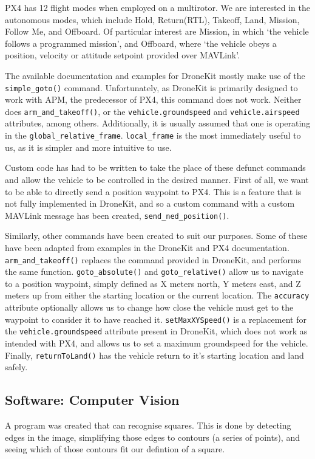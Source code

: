 \documentclass[11pt]{article}
\begin{document}
PX4 has 12 flight modes when employed on a multirotor. We are interested in the autonomous modes, which include Hold, Return(RTL), Takeoff, Land, Mission, Follow Me, and Offboard. Of particular interest are Mission, in which `the vehicle follows a programmed mission', and Offboard, where `the vehicle obeys a position, velocity or attitude setpoint provided over MAVLink'.\cite{PX4_user_guide}

The available documentation and examples for DroneKit mostly make use of the \lstinline[language=Python]|simple_goto()| command. Unfortunately, as DroneKit is primarily designed to work with APM, the predecessor of PX4, this command does not work. Neither does \lstinline[language=Python]|arm_and_takeoff()|, or the \lstinline|vehicle.groundspeed| and \lstinline|vehicle.airspeed| attributes, among others. Additionally, it is usually assumed that one is operating in the \lstinline|global_relative_frame|. \lstinline|local_frame| is the most immediately useful to us, as it is simpler and more intuitive to use.

Custom code has had to be written to take the place of these defunct commands and allow the vehicle to be controlled in the desired manner. First of all, we want to be able to directly send a position waypoint to PX4. This is a feature that is not fully implemented in DroneKit, and so a custom command with a custom MAVLink message has been created, \lstinline|send_ned_position()|.

Similarly, other commands have been created to suit our purposes. Some of these have been adapted from examples in the DroneKit and PX4 documentation.\cite{dronekit}\cite{PX4_dev_guide} \lstinline|arm_and_takeoff()| replaces the command provided in DroneKit, and performs the same function. \lstinline|goto_absolute()| and \lstinline|goto_relative()| allow us to navigate to a position waypoint, simply defined as X meters north, Y meters east, and Z meters up from either the starting location or the current location. The \lstinline|accuracy| attribute optionally allows us to change how close the vehicle must get to the waypoint to consider it to have reached it. \lstinline|setMaxXYSpeed()| is a replacement for the \lstinline|vehicle.groundspeed| attribute present in DroneKit, which does not work as intended with PX4, and allows us to set a maximum groundspeed for the vehicle. Finally, \lstinline|returnToLand()| has the vehicle return to it's starting location and land safely.

\subsection{Software: Computer Vision}
A program was created that can recognise squares. This is done by detecting edges in the image, simplifying those edges to contours (a series of points), and seeing which of those contours fit our defintion of a square.
\end{document}
